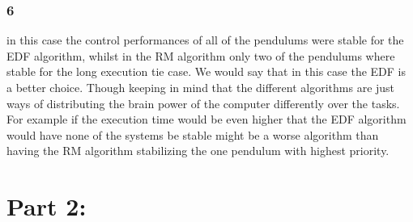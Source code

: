 \documentclass[10pt,a4paper]{article}
\begin{document}
\subsubsection*{6}
in this case the control performances of all of the pendulums were stable for the EDF algorithm, whilst in the RM algorithm only two of the pendulums where stable for the long execution tie case. We would say that in this case the EDF is a better choice. Though keeping in mind that the different algorithms are just ways of distributing the brain power of the computer differently over the tasks. For example if the execution time would be even higher that the EDF algorithm would have none of the systems be stable might be a worse algorithm than having the RM algorithm stabilizing the one pendulum with highest priority.
\newpage
\newpage
\section*{Part 2:}
\end{document}
